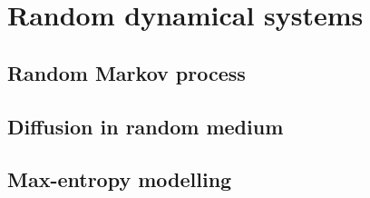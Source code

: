 \documentclass[11pt]{article}
\renewcommand{\=}[1]{\stackrel{#1}{=}} %
\renewcommand{\(}{\left (}
\renewcommand{\)}{\right  )}
\renewcommand{\[}{\left [}
\renewcommand{\]}{\right ]}
\newcommand{\<}{\left <}
\renewcommand{\>}{\right >}
\theoremstyle{definition}
\theoremstyle{remark}
\begin{document}
\section{Random dynamical systems}
\subsection{Random Markov process}
\subsection{Diffusion in random medium}
\subsection{Max-entropy modelling}


%

\end{document}
